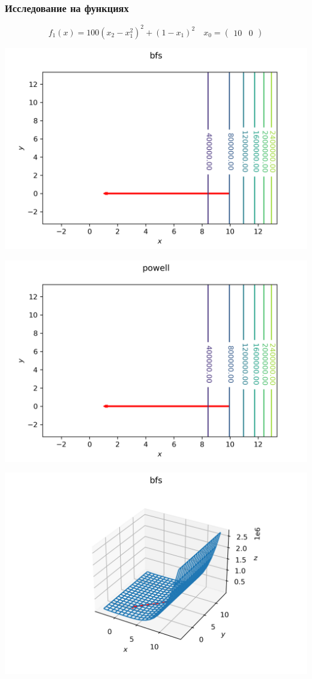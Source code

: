 \documentclass[english]{article}
\begin{document}
\subsubsection{Исследование на функциях}
\[ f_1(x) = 100(x_2 - x_1^2)^2 + (1 - x_1)^2  \quad x_0 = \begin{pmatrix}
  10 & 0
\end{pmatrix}\]
\begin{center}
  \includegraphics[scale=0.7]{plots/contours_bfs_6.png}
\end{center}
\begin{center}
  \includegraphics[scale=0.7]{plots/contours_powell_6.png}
\end{center}
\begin{center}
  \includegraphics[scale=0.7]{plots/3D_bfs_6.png}
\end{center}
\end{document}
